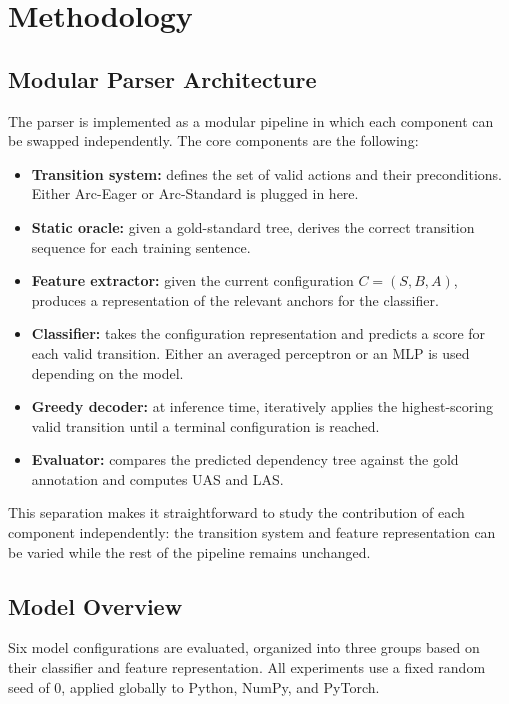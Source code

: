 \documentclass[12pt,letterpaper]{article}
\begin{document}
\section{Methodology}
\label{sec:methodology}

\subsection{Modular Parser Architecture}
\label{subsec:architecture}

The parser is implemented as a modular pipeline in which each component can be swapped independently. The core components are the following:

\begin{itemize}
\item \textbf{Transition system:} defines the set of valid actions and their preconditions. Either Arc-Eager or Arc-Standard is plugged in here.
\item \textbf{Static oracle:} given a gold-standard tree, derives the correct transition sequence for each training sentence.
\item \textbf{Feature extractor:} given the current configuration $C = (S, B, A)$, produces a representation of the relevant anchors for the classifier.
\item \textbf{Classifier:} takes the configuration representation and predicts a score for each valid transition. Either an averaged perceptron or an MLP is used depending on the model.
\item \textbf{Greedy decoder:} at inference time, iteratively applies the highest-scoring valid transition until a terminal configuration is reached.
\item \textbf{Evaluator:} compares the predicted dependency tree against the gold annotation and computes UAS and LAS.
\end{itemize}

This separation makes it straightforward to study the contribution of each component independently: the transition system and feature representation can be varied while the rest of the pipeline remains unchanged.

\subsection{Model Overview}
\label{subsec:model_overview}

Six model configurations are evaluated, organized into three groups based on their classifier and feature representation. All experiments use a fixed random seed of 0, applied globally to Python, NumPy, and PyTorch.
\end{document}
